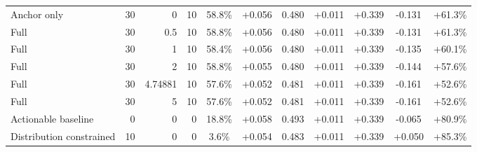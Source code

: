 \begin{table}[htbp]
\begin{tabular}{lrrrccccccc}
Anchor only & 30 & 0 & 10 & 58.8\% & +0.056 & 0.480 & +0.011 & +0.339 & -0.131 & +61.3\% \\
Full & 30 & 0.5 & 10 & 58.8\% & +0.056 & 0.480 & +0.011 & +0.339 & -0.131 & +61.3\% \\
Full & 30 & 1 & 10 & 58.4\% & +0.056 & 0.480 & +0.011 & +0.339 & -0.135 & +60.1\% \\
Full & 30 & 2 & 10 & 58.8\% & +0.055 & 0.480 & +0.011 & +0.339 & -0.144 & +57.6\% \\
Full & 30 & 4.74881 & 10 & 57.6\% & +0.052 & 0.481 & +0.011 & +0.339 & -0.161 & +52.6\% \\
Full & 30 & 5 & 10 & 57.6\% & +0.052 & 0.481 & +0.011 & +0.339 & -0.161 & +52.6\% \\
Actionable baseline & 0 & 0 & 0 & 18.8\% & +0.058 & 0.493 & +0.011 & +0.339 & -0.065 & +80.9\% \\
Distribution constrained & 10 & 0 & 0 & 3.6\% & +0.054 & 0.483 & +0.011 & +0.339 & +0.050 & +85.3\% \\
\bottomrule
\end{tabular}
\end{table}